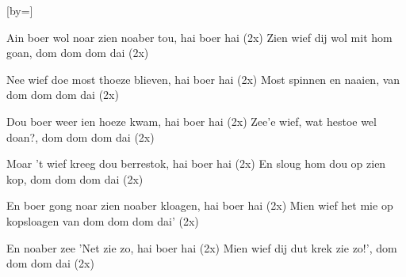  

[by=]

\beginverse
Ain boer wol noar zien noaber tou, hai boer hai   (2x)
Zien wief dij wol mit hom goan, dom dom dom dai   (2x)
\endverse

\beginverse
Nee wief doe most thoeze blieven, hai boer hai   (2x)
Most spinnen en naaien, van dom dom dom dai   (2x)
\endverse

\beginverse

Dou boer weer ien hoeze kwam, hai boer hai   (2x)
Zee'e wief, wat hestoe wel doan?, dom dom dom dai   (2x)
\endverse

\beginverse

Moar 't wief kreeg dou berrestok, hai boer hai   (2x)
En sloug hom dou op zien kop, dom dom dom dai   (2x)
\endverse

\beginverse

En boer gong noar zien noaber kloagen, hai boer hai   (2x)
Mien wief het mie op kopsloagen van dom dom dom dai'   (2x)
\endverse

\beginverse

En noaber zee 'Net zie zo, hai boer hai   (2x)
Mien wief dij dut krek zie zo!', dom dom dom dai   (2x)
\endverse


\endsong
